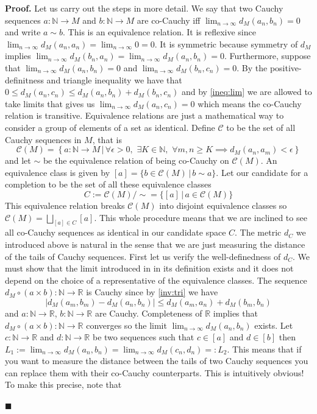\documentclass[10pt]{article}
\theoremstyle{definition}
\theoremstyle{remark}
\newenvironment{prf}{\noindent\textbf{Proof.}}{\hfill$\blacksquare$}
\begin{document}
\begin{prf}
Let us carry out the steps in more detail. We say that two Cauchy sequences $a:\mathbb{N}\to M$ and $b:\mathbb{N}\to M$ are co-Cauchy iff $\lim_{n\to\infty}d_M(a_n,b_n)=0$ and write $a\sim b$. This is an equivalence relation. It is reflexive since $\lim_{n\to\infty}d_M(a_n,a_n)=\lim_{n\to\infty}0=0$. It is symmetric because symmetry of $d_M$ implies $\lim_{n\to\infty}d_M(b_n,a_n)=\lim_{n\to\infty}d_M(a_n,b_n)=0$. Furthermore, suppose that $\lim_{n\to\infty}d_M(a_n,b_n)=0$ and $\lim_{n\to\infty}d_M(b_n,c_n)=0$. By the positive-definitness and triangle inequality we have that $0\leq d_M(a_n,c_n)\leq d_M(a_n,b_n)+d_M(b_n,c_n)$ and by \cref{ineq:lim} we are allowed to take limits that gives us $\lim_{n\to\infty}d_M(a_n,c_n)=0$ which means the co-Cauchy relation is transitive. Equivalence relations are just a mathematical way to consider a group of elements of a set as identical. Define $\mathscr{C}$ to be the set of all Cauchy sequences in $M$, that is
\begin{equation}
\mathscr{C}(M)=\left\{a:\mathbb{N}\to M\,|\,\forall\epsilon>0,\,\,\exists K\in\mathbb{N},\,\,\forall m,n\ge K \implies d_M(a_n,a_m)<\epsilon\right\}
\end{equation}
and let $\sim$ be the equivalence relation of being co-Cauchy on $\mathscr{C}(M)$. An equivalence class is given by $[a]=\{b\in\mathscr{C}(M)\,|\,b\sim a\}$. Let our candidate for a completion to be the set of all these equivalence classes
\begin{equation}
C:=\mathscr{C}(M)/\sim=\{[a]\,|\,a\in\mathscr{C}(M)\}
\end{equation}
This equivalence relation breaks $\mathscr{C}(M)$ into disjoint equivalence classes so $\mathscr{C}(M)=\bigsqcup_{[a]\in C}[a]$. This whole procedure means that we are inclined to see all co-Cauchy sequences as identical in our candidate space $C$. The metric $d_C$ we introduced above is natural in the sense that we are just measuring the distance of the tails of Cauchy sequences. First let us verify the well-definedness of $d_C$. We must show that the limit introduced in in its definition exists and it does not depend on the choice of a representative of the equivalence classes. The sequence $d_M\circ(a\times b):\mathbb{N}\to \mathbb{R}$ is Cauchy since by \cref{inv:tri} we have
\begin{equation}
|d_M(a_m,b_m)-d_M(a_n,b_n)|\leq d_M(a_m,a_n)+d_M(b_m,b_n)
\end{equation}
and $a:\mathbb{N}\to\mathbb{R}$, $b:\mathbb{N}\to\mathbb{R}$ are Cauchy. Completeness of $\mathbb{R}$ implies that $d_M\circ(a\times b):\mathbb{N}\to \mathbb{R}$ converges so the limit $\lim_{n\to\infty}d_M(a_n,b_n)$ exists. Let $c:\mathbb{N}\to\mathbb{R}$ and $d:\mathbb{N}\to\mathbb{R}$ be two sequences such that $c\in [a]$ and $d\in [b]$ then $L_1:=\lim_{n\to\infty}d_M(a_n,b_n)=\lim_{n\to\infty}d_M(c_n,d_n)=:L_2$. This means that if you want to measure the distance between the tails of two Cauchy sequences you can replace them with their co-Cauchy counterparts. This is intuitively obvious! To make this precise, note that

\end{prf}
\end{document}
